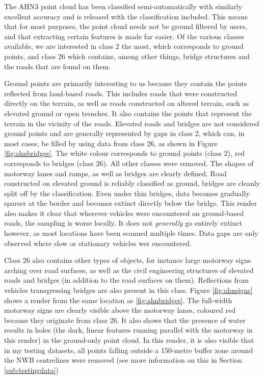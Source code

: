 The AHN3 point cloud has been classified semi-automatically with similarly excellent accuracy and is released with the classification included. This means that for most purposes, the point cloud needs not be ground filtered by users, and that extracting certain features is made far easier. Of the various classes available, we are interested in class 2 the most, which corresponds to ground points, and class 26 which contains, among other things, bridge structures and the roads that are found on them.

Ground points are primarily interesting to us because they contain the points reflected from land-based roads. This includes roads that were constructed directly on the terrain, as well as roads constructed on altered terrain, such as elevated ground or open trenches. It also contains the points that represent the terrain in the vicinity of the roads. Elevated roads and bridges are not considered ground points and are generally represented by gaps in class 2, which can, in most cases, be filled by using data from class 26, as shown in Figure \ref{fig:ahnbridges}. The white colour corresponds to ground points (class 2), red corresponds to bridges (class 26). All other classes were removed. The shapes of motorway lanes and ramps, as well as bridges are clearly defined. Road constructed on elevated ground is reliably classified as ground, bridges are cleanly split off by the classification. Even under thin bridges, data becomes gradually sparser at the border and becomes extinct directly below the bridge. This render also makes it clear that wherever vehicles were encountered on ground-based roads, the sampling is worse locally. It does not \textit{generally} go entirely extinct however, as most locations have been scanned multiple times. Data gaps are only observed where slow or stationary vehicles wer encountered.

Class 26 also contains other types of objects, for instance large motorway signs arching over road surfaces, as well as the civil engineering structures of elevated roads and bridges (in addition to the road surfaces on them). Reflections from vehicles transgressing bridges are also present in this class. Figure \ref{fig:ahnsigns} shows a render from the same location as \ref{fig:ahnbridges}. The full-width motorway signs are clearly visible above the motorway lanes, coloured red because they originate from class 26. It also shows that the presence of water results in holes (the dark, linear features running parallel with the motorway in this render) in the ground-only point cloud. In this render, it is also visible that in my testing datasets, all points falling outside a 150-metre buffer zone around the NWB centrelines were removed (see more information on this in Section \ref{sub:testingdata})

